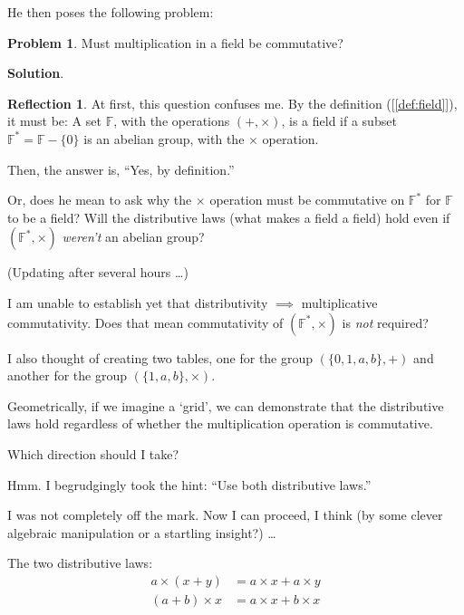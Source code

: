 \documentclass[english,notitlepage,smartquotes]{hgbreport}
\theoremstyle{definition}
\theoremstyle{definition}
\newtheorem{problem}{Problem}
\theoremstyle{remark}
\theoremstyle{definition}
\theoremstyle{plain}
\theoremstyle{definition}
\newtheorem{reflection}{Reflection}
\begin{document}
He then poses the following problem:

\begin{problem}
Must multiplication in a field be commutative?
\label{pr:xcomreq}
\end{problem}

\textbf{Solution}.
\begin{reflection}
At first, this question confuses me. By the definition ([\ref{def:field}]), it must be: A set $\mathbb{F}$, with the operations $(+,\times)$, is a field if a subset $\mathbb{F}^*=\mathbb{F}-\{0\}$ is an abelian group, with the $\times$ operation. 

Then, the answer is, ``Yes, by definition.''

Or, does he mean to ask why the $\times$ operation must be commutative on $\mathbb{F}^*$ for $\mathbb{F}$ to be a field? Will the distributive laws (what makes a field a field) hold even if $(\mathbb{F}^*,\times)$ \emph{weren't} an abelian group?

(Updating after several hours \dots) 

I am unable to establish yet that distributivity $\implies$ multiplicative commutativity. Does that mean commutativity of $(\mathbb{F}^*,\times)$ is \emph{not} required?

I also thought of creating two tables, one for the group $(\{0,1,a,b\}, +)$ and another for the group $(\{1,a,b\},\times)$.

Geometrically, if we imagine a `grid', we can demonstrate that the distributive laws hold regardless of whether the multiplication operation is commutative.

Which direction should I take?

Hmm. I begrudgingly took the hint: ``Use both distributive laws.'' 

I was not completely off the mark. Now I can proceed, I think (by some clever algebraic manipulation or a startling insight?) \dots

The two distributive laws:
\begin{equation*}
\begin{aligned}
a\times(x+y)  &= a\times x+a\times y\\
(a+b)\times x &= a\times x+b\times x
\end{aligned}
\end{equation*}

\end{reflection}
\end{document}
